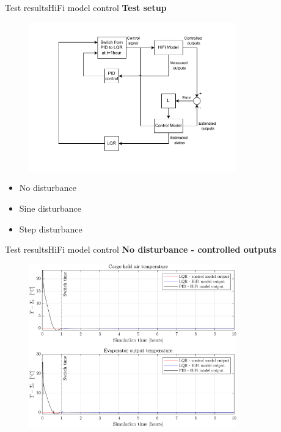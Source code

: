 \begin{frame}{Test results}{HiFi model control}
	 \textbf{Test setup}
	 \begin{figure}[h!]
	 	\centering
	 	\includegraphics[width=0.8\textwidth]{../Graphics/HiFi_simulation_test_diagram.pdf}
	 	\label{fig:test_setup}
	 \end{figure}
 \begin{itemize}
 	\item No disturbance
 	\item Sine disturbance
 	\item Step disturbance
 \end{itemize}
\end{frame}


\begin{frame}{Test results}{HiFi model control}
	\textbf{No disturbance - controlled outputs}
	\begin{figure}[H]
		\centering
		\includegraphics[width=0.8\textwidth]{../Graphics/fig_LQRvsKresten_noDist.png}
	\end{figure} 
\end{frame}

